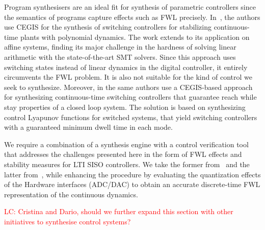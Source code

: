 \documentclass[runningheads,a4paper]{llncs}
\begin{document}
Program synthesisers are an ideal fit for synthesis of parametric
controllers since the semantics of programs capture effects such as FWL
precisely.  In~\cite{DBLP:conf/cdc/RavanbakhshS15}, the authors use CEGIS
for the synthesis of switching controllers for stabilizing continuous-time
plants with polynomial dynamics.  The work extends to its application on
affine systems, finding its major challenge in the hardness of solving
linear arithmetic with the state-of-the-art SMT solvers.  Since this
approach uses switching states instead of linear dynamics in the digital
controller, it entirely circumvents the FWL problem.  It is also not
suitable for the kind of control we seek to synthesize.
Moreover, in \cite{DBLP:conf/emsoft/RavanbakhshS16} the same authors 
use a CEGIS-based approach for synthesizing continuous-time switching
controllers that guarantee reach while stay properties of a closed
loop system. The solution is based on synthesizing control Lyapunov
functions for switched systems, that yield switching controllers with
a guaranteed minimum dwell time in each mode.

We require a
combination of a synthesis engine with a control verification tool that
addresses the challenges presented here in the form of FWL effects and
stability measures for LTI SISO controllers.  We take the former
from~\cite{DBLP:conf/lpar/DavidKL15} and the latter from~\cite{daes20161},
while enhancing the procedure by evaluating the quantization effects of the
Hardware interfaces (ADC/DAC) to obtain an accurate discrete-time FWL
representation of the continuous dynamics.




\textcolor{red}{LC: Cristina and Dario, should we further expand this section with other initiatives to synthesise control systems?}


  
\end{document}
